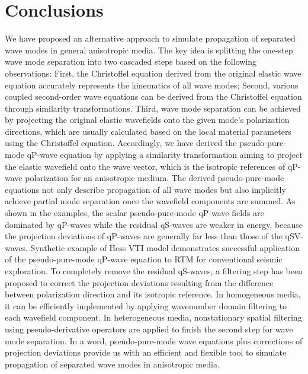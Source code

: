 \section{Conclusions}
We have proposed an alternative approach 
to simulate propagation of separated wave modes in general anisotropic media.
The key idea is splitting the one-step wave mode separation into two cascaded steps based on the following
observations: First, the Christoffel equation derived from the original elastic wave equation 
accurately represents the kinematics of all wave modes; Second, various coupled 
second-order wave equations can be derived from the Christoffel equation
through similarity transformations. Third, wave mode separation can be achieved by projecting the original
elastic wavefields onto the given mode's polarization directions, which are usually calculated 
based on the local material parameters using the Christoffel equation.
Accordingly, we have derived the pseudo-pure-mode qP-wave equation by applying a similarity transformation 
aiming to project the elastic wavefield onto the wave vector, which
is the isotropic references of qP-wave polarization for an anisotropic medium.
The derived pseudo-pure-mode equations not only describe propagation of all wave modes
but also implicitly achieve partial mode separation once the wavefield components are summed.
As shown in the examples,
the scalar pseudo-pure-mode qP-wave fields
are dominated by qP-waves while the residual
 qS-waves are weaker in energy, because the projection deviations of qP-waves are generally far less than those of the qSV-waves.
Synthetic example of Hess VTI model demonstrates successful application of the pseudo-pure-mode qP-wave
equation to RTM for conventional seismic exploration.
To completely remove the residual qS-waves, a filtering step has been proposed 
to correct the projection
 deviations resulting from the difference between polarization direction and its isotropic reference.
In homogeneous media, it can be efficiently implemented by applying wavenumber domain filtering to each
 wavefield component. In heterogeneous media, nonstationary spatial filtering using 
pseudo-derivative operators are applied to finish the second step for wave mode separation.
In a word, pseudo-pure-mode wave equations plus corrections of projection deviations provide us with an efficient
and flexible tool to simulate propagation of separated wave modes in anisotropic media.

